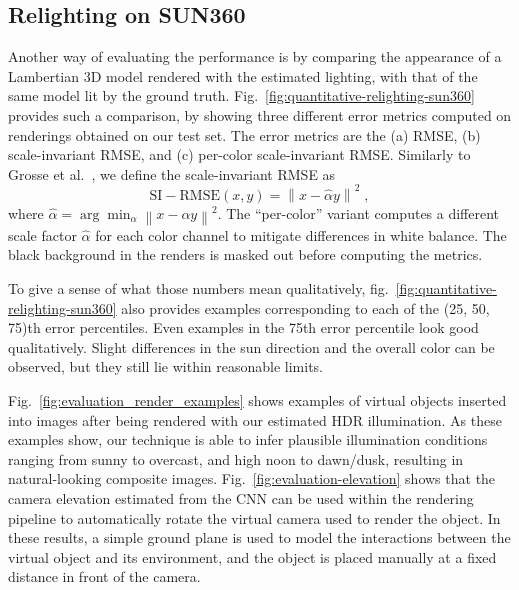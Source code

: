 \subsection{Relighting on SUN360}

Another way of evaluating the performance is by comparing the appearance of a Lambertian 3D model rendered with the estimated lighting, with that of the same model lit by the ground truth. Fig.~\ref{fig:quantitative-relighting-sun360} provides such a comparison, by showing three different error metrics computed on renderings obtained on our test set. The error metrics are the (a) RMSE, (b) scale-invariant RMSE, and (c) per-color scale-invariant RMSE. Similarly to Grosse et al.~\cite{grosse-iccv-09}, we define the scale-invariant RMSE as 
\begin{equation}
\mathrm{SI-RMSE}(x, y) = \left\lVert x - \hat{\alpha} y \right\rVert^2  \;,
\end{equation}
where $\hat{\alpha} = \arg \min_\alpha \left\lVert x - \alpha y \right\rVert^2 $. The ``per-color'' variant computes a different scale factor $\hat{\alpha}$ for each color channel to mitigate differences in white balance. The black background in the renders is masked out before computing the metrics.
  
To give a sense of what those numbers mean qualitatively, fig.~\ref{fig:quantitative-relighting-sun360} also provides examples corresponding to each of the (25, 50, 75)th error percentiles. Even examples in the 75th error percentile look good qualitatively. Slight differences in the sun direction and the overall color can be observed, but they still lie within reasonable limits.

Fig.~\ref{fig:evaluation_render_examples} shows examples of virtual objects inserted into images after being rendered with our estimated HDR illumination. As these examples show, our technique is able to infer plausible illumination conditions ranging from sunny to overcast, and high noon to dawn/dusk, resulting in natural-looking composite images. Fig.~\ref{fig:evaluation-elevation} shows that the camera elevation estimated from the CNN can be used within the rendering pipeline to automatically rotate the virtual camera used to render the object. In these results, a simple ground plane is used to model the interactions between the virtual object and its environment, and the object is placed manually at a fixed distance in front of the camera.


